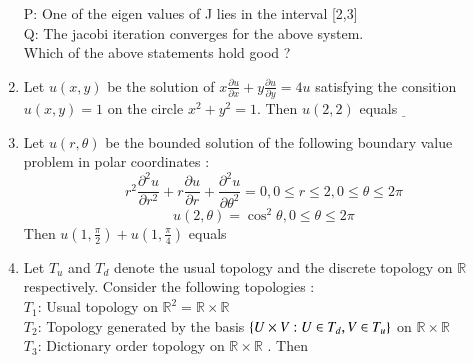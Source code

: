 \documentclass[journal]{IEEEtran}
\begin{document}
\begin{enumerate}
		P: One of the eigen values of J lies in the interval [2,3] \\
		Q: The jacobi iteration converges for the above system. \\
		Which of the above statements hold good ?
		\begin{enumerate}
		\end{enumerate}
	\item Let $u(x,y)$ be the solution of $x \frac{\partial u}{\partial x} + y \frac{\partial u}{\partial y} = 4u$ satisfying the consition $u(x,y)=1$ on the circle $x^2 + y^2 = 1$. Then $u(2,2)$ equals $\underline{   }$
	\item Let $u(r, \theta)$ be the bounded solution of the following boundary value problem in polar coordinates :
		$$ r^2 \frac{\partial^2 u}{\partial r^2} + r \frac{\partial u}{\partial r} + \frac{\partial ^2 u}{\partial \theta ^2} = 0, 0 \leq r \leq 2, 0 \leq \theta \leq 2 \pi$$
		$$ u(2,\theta) = \cos^2{\theta}, 0 \leq \theta \leq 2 \pi$$
		Then $u(1, \frac{\pi}{2}) + u(1, \frac{\pi}{4})$ equals
		\begin{enumerate}
				\begin{multicols}{4}
				\item 1
				\item $\frac{9}{8}$
				\item $\frac{7}{8}$
				\item $\frac{3}{8}$
				\end{multicols}
		\end{enumerate}
	\item Let $T_u$ and $T_d$ denote the usual topology and the discrete topology on $\mathbb{R}$ respectively. Consider the following topologies : \\
		$T_1$: Usual topology on $\mathbb{R}^2 = \mathbb{R} \times \mathbb{R} $ \\
		$T_2$: Topology generated by  the basis $\left\{U \times V : U \in T_d, V \in T_u\right\}$ on $\mathbb{R} \times \mathbb{R}$ \\
		$T_3$: Dictionary order topology on $\mathbb{R} \times \mathbb{R}$ . Then
		\begin{enumerate}
				\begin{multicols}{2}

\end{multicols}
\end{enumerate}
\end{enumerate}
\end{document}
